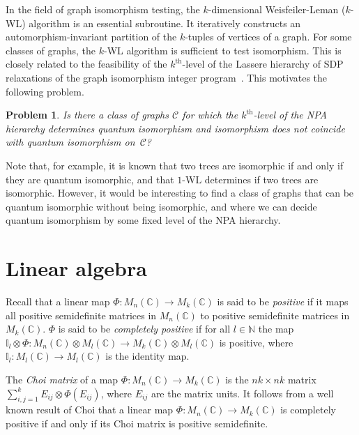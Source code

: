 \documentclass[a4paper,onecolumn,11pt,accepted=2026-01-06]{quantumarticle}
\theoremstyle{plain}
\newtheorem{prob}[thm]{Problem}
\theoremstyle{remark}
\theoremstyle{definition}
\newcommand{\complex}{\mathbb{C}}
\begin{document}
In the field of graph isomorphism testing, the $k$-dimensional Weisfeiler-Leman ($k$-WL) algorithm is an essential subroutine.
It iteratively constructs an automorphism-invariant partition of the $k$-tuples of vertices of a graph.
For some classes of graphs, the $k$-WL algorithm is sufficient to test isomorphism.
This is closely related to the feasibility of the $k^{\text{th}}$-level of the Lassere hierarchy of SDP relaxations of the graph isomorphism integer program~\cite{roberson-seppelt-arxiv}.
This motivates the following problem.

\begin{prob}
  Is there a class of graphs $\mathcal{C}$ for which the $k^{\text{th}}$-level of the NPA hierarchy determines quantum isomorphism and isomorphism does not coincide with quantum isomorphism on~$\mathcal{C}$?
\end{prob}

Note that, for example, it is known that two trees are isomorphic if and only if they are quantum isomorphic, and that $1$-WL determines if two trees are isomorphic. However, it would be interesting to find a class of graphs that can be quantum isomorphic without being isomorphic, and where we can decide quantum isomorphism by some fixed level of the NPA hierarchy.  




\appendix

\newpage

\section{Linear algebra}\label{app:linalg}

Recall that a linear map $\Phi: M_n(\mathbb{C}) \to M_k(\mathbb{C})$ is said to be \emph{positive} if it maps all positive semidefinite matrices in $M_n(\mathbb{C})$ to positive semidefinite matrices in $M_k(\mathbb{C})$. $\Phi$ is said to be \emph{completely positive} if for all $l \in \mathbb{N}$ the map $\mathbb{I}_l \otimes \Phi : M_n(\complex) \otimes M_l(\complex) \to M_k(\complex) \otimes M_l(\complex)$ is positive, where $\mathbb{I}_l: M_l(\mathbb{C}) \to M_l(\complex)$ is the identity map. 

The \emph{Choi matrix} of a map $\Phi: M_n(\mathbb{C}) \to M_k(\mathbb{C})$ is the $nk \times nk$ matrix $\sum_{i,j = 1}^k E_{ij}\otimes \Phi(E_{ij})$, where $E_{ij}$ are the matrix units. It follows from a well known result of Choi \cite{CHOI1975285} that a linear map $\Phi: M_n(\mathbb{C}) \to M_k(\mathbb{C})$ is completely positive if and only if its Choi matrix is positive semidefinite. 
\end{document}
